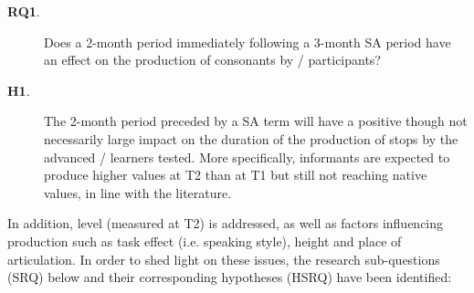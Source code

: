 \documentclass[output=paper]{langsci/langscibook}
\begin{document}
\begin{description}
\item[\textbf{RQ1}.] Does a 2-month  period immediately following a 3-month SA period have an effect on the  production of   consonants by /  participants?

\item[\textbf{H1}.] The 2-month  period preceded by a SA term will have a positive though not necessarily large impact on the duration of the  production of  stops by the advanced / learners tested. More specifically, informants are expected to produce higher  values at T2 than at T1 but still not reaching native values, in line with the literature. 
\end{description}


In addition,  level (measured at T2) is addressed, as well as factors influencing  production such as task effect (i.e. speaking style),  height and place of articulation. In order to shed light on these issues, the research sub-questions (SRQ) below and their corresponding hypotheses (HSRQ) have been identified:
\end{document}
